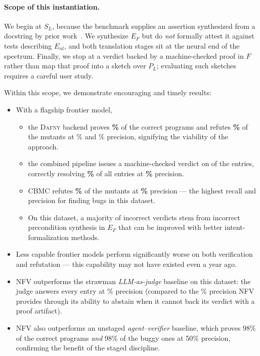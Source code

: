 \documentclass[11pt,letterpaper]{article}
\newcommand{\daf}{\textsc{Dafny}}
\newcommand{\cbmc}{\textsc{CBMC}}
\begin{document}
\paragraph{Scope of this instantiation.} We begin at $S_L$, because the
benchmark supplies an assertion synthesized from a docstring by prior
work~\cite{endres2024nl2postcond}. We synthesize $E_F$ but do \emph{not}
formally attest it against tests describing $E_{nl}$, and both translation
stages sit at the neural end of the spectrum. Finally, we stop at a verdict
backed by a machine-checked proof in $F$ rather than map that proof into a
sketch over $P_L$; evaluating such sketches requires a careful user study.

\noindent
Within this scope, we demonstrate encouraging and timely results:

\begin{itemize}
\item With a flagship frontier model, 
\begin{itemize}
  \item the \daf{} backend proves \textbf{\anverifyrawrec{}\%} of the correct programs and refutes
\textbf{\anrefuterawrec{}\%} of the
mutants at \anverifyrawprec{}\% and \anrefuterawprec{}\% precision, signifying the viability of the approach.
  \item the combined pipeline issues a machine-checked verdict on
\anpipeissued{} of the \anpipepop{} entries, correctly resolving
\textbf{\anpiperec{}\%} of all entries at \textbf{\anpipeprec{}\%} precision.
\item \cbmc{} refutes \textbf{\cbmccexrec{}\%} of the mutants at
\textbf{\cbmccexprec{}\%} precision --- the highest recall and precision for
finding bugs in this dataset.
 \item On this dataset, a majority of incorrect verdicts stem from incorrect precondition synthesis in $E_F$ that can be improved with
better intent-formalization methods.
\end{itemize}
\item Less capable frontier models perform significantly worse on both verification and refutation --- this capability 
may not have existed even a year ago.
\item NFV outperforms the strawman \emph{LLM-as-judge} baseline on this dataset: the judge answers
every entry at \jdgallprec{}\% precision
(compared to the \anpipeprec{}\% precision NFV provides through its ability to abstain when it cannot
back its verdict with a proof artifact). 
\item NFV also outperforms an unstaged \emph{agent--verifier} baseline, which proves
98\% of the correct programs \emph{and} 98\% of the buggy ones at 50\% precision,
confirming the benefit of the staged discipline.
\end{itemize}
\end{document}
